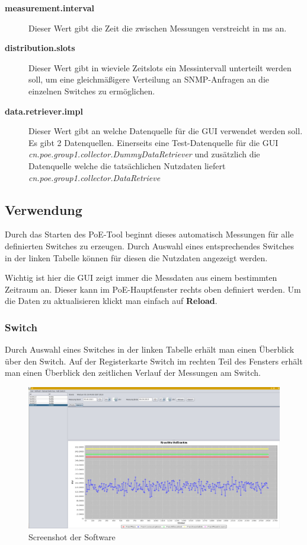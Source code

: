 \begin{description}
  \item [\textbf{measurement.interval}] Dieser Wert gibt die Zeit die zwischen
  Messungen verstreicht in ms an.
  \item [\textbf{distribution.slots}] Dieser Wert gibt in wieviele Zeitslots ein
  Messintervall unterteilt werden soll, um eine gleichmäßigere Verteilung an
  SNMP-Anfragen an die einzelnen Switches zu ermöglichen.
  \item [\textbf{data.retriever.impl}] Dieser Wert gibt an welche Datenquelle
  für die GUI verwendet werden soll. Es gibt 2 Datenquellen. Einerseits eine
  Test-Datenquelle für die GUI
  \textit{cn.poe.group1.collector.DummyDataRetriever} und zusätzlich die
  Datenquelle welche die tatsächlichen Nutzdaten liefert \textit{cn.poe.group1.collector.DataRetrieve}
\end{description}

\subsection{Verwendung}

Durch das Starten des PoE-Tool beginnt dieses automatisch Messungen für alle
definierten Switches zu erzeugen. Durch Auswahl eines entsprechendes Switches in
der linken Tabelle  können für diesen die Nutzdaten angezeigt werden.

Wichtig ist hier die GUI zeigt immer die Messdaten aus einem bestimmten Zeitraum
an. Dieser kann im PoE-Hauptfenster rechts oben definiert werden. Um die Daten
zu aktualisieren klickt man einfach auf \textbf{Reload}.

\subsubsection{Switch}

Durch Auswahl eines Switches in der linken Tabelle erhält man einen Überblick
über den Switch. Auf der Registerkarte Switch im rechten Teil des Fensters
erhält man einen Überblick den zeitlichen Verlauf der Messungen am Switch.

\begin{figure}[h]
    \centering
    \leavevmode
    \includegraphics[width=1.0\linewidth]{figures/screenshot2.jpg}
    \caption{Screenshot der Software}
    \label{fig:PoE-Screenshot}
\end{figure}


